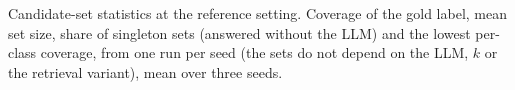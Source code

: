 \begin{table}[t]
  \centering
  \small
  
  \caption{Candidate-set statistics at the reference setting. Coverage of the gold label, mean set size, share of singleton sets (answered without the LLM) and the lowest per-class coverage, from one run per seed (the sets do not depend on the LLM, $k$ or the retrieval variant), mean over three seeds.}
  \label{tab:set_stats}
\end{table}
